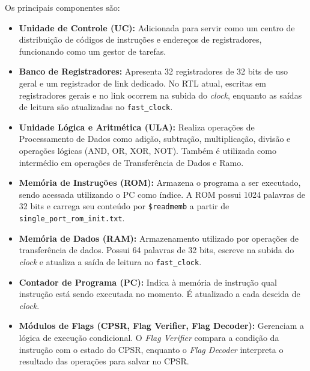 \documentclass[
	12pt,				%
	oneside,
	a4paper,			%
	english,			%
	french,				%
	spanish,			%
	brazil,				%
	]{abntex2}
\begin{document}
Os principais componentes são:
\begin{itemize}
    \item \textbf{Unidade de Controle (UC):} Adicionada para servir como um centro de distribuição de códigos de instruções e endereços de registradores, funcionando como um gestor de tarefas.
    \item \textbf{Banco de Registradores:} Apresenta 32 registradores de 32 bits de uso geral e um registrador de link dedicado. No RTL atual, escritas em registradores gerais e no link ocorrem na subida do \emph{clock}, enquanto as saídas de leitura são atualizadas no \texttt{fast\_clock}.
    \item \textbf{Unidade Lógica e Aritmética (ULA):} Realiza operações de Processamento de Dados como adição, subtração, multiplicação, divisão e operações lógicas (AND, OR, XOR, NOT). Também é utilizada como intermédio em operações de Transferência de Dados e Ramo.
    \item \textbf{Memória de Instruções (ROM):} Armazena o programa a ser executado, sendo acessada utilizando o PC como índice. A ROM possui 1024 palavras de 32 bits e carrega seu conteúdo por \texttt{\$readmemb} a partir de \texttt{single\_port\_rom\_init.txt}.
    \item \textbf{Memória de Dados (RAM):} Armazenamento utilizado por operações de transferência de dados. Possui 64 palavras de 32 bits, escreve na subida do \emph{clock} e atualiza a saída de leitura no \texttt{fast\_clock}.
    \item \textbf{Contador de Programa (PC):} Indica à memória de instrução qual instrução está sendo executada no momento. É atualizado a cada descida de \emph{clock}.
    \item \textbf{Módulos de Flags (CPSR, Flag Verifier, Flag Decoder):} Gerenciam a lógica de execução condicional. O \emph{Flag Verifier} compara a condição da instrução com o estado do CPSR, enquanto o \emph{Flag Decoder} interpreta o resultado das operações para salvar no CPSR.
\end{itemize}
\end{document}
